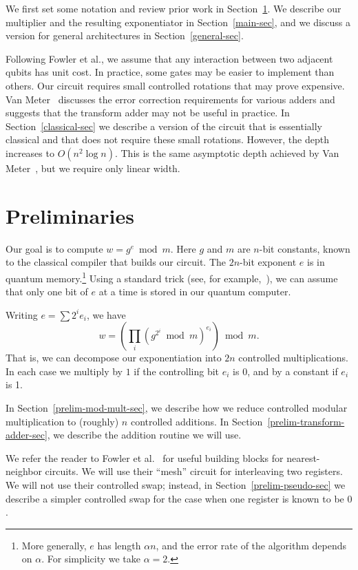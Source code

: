 \documentclass{article} %
\begin{document}
We first set some notation and review prior work in Section~\ref{prelim-sec}.
We describe our multiplier and the resulting exponentiator
in Section~\ref{main-sec}, and we discuss a version for general
architectures in Section~\ref{general-sec}.

Following Fowler et al., we assume that any interaction between two
adjacent qubits has unit cost.  In practice, some gates may be easier
to implement than others.  Our circuit requires small controlled rotations
that may prove expensive.  Van Meter~\cite{V} discusses the error correction
requirements for various adders and suggests that the transform adder may not
be useful in practice.
In Section~\ref{classical-sec}
we describe a version of the circuit that is essentially classical
and that does not require these small rotations.  However, the
depth increases to $O(n^2 \log n)$.  This is the same asymptotic
depth achieved by Van Meter~\cite{V}, but we require only linear width.

\section{Preliminaries}
\label{prelim-sec}

Our goal is to compute $w = g^e \bmod m$.  Here $g$ and $m$
are $n$-bit constants, known to the classical compiler that builds
our circuit.  The $2n$-bit exponent $e$ is in quantum
memory.\footnote{More generally, $e$ has length $\alpha n$, and the
error rate of the algorithm depends on $\alpha$.  For simplicity
we take $\alpha = 2$.}  Using
a standard trick (see, for example,~\cite{Beau}),
we can assume that only one bit of
$e$ at a time is stored in our quantum computer.

Writing $e = \sum 2^i e_i$, we have 
$$
w = \left(\prod_i (g^{2^i} \bmod m)^{e_i}\right) \bmod m.
$$
That is, we can decompose our exponentiation into $2n$ controlled
multiplications.  In each case we multiply by $1$ if the controlling
bit $e_i$ is $0$, and by a constant if $e_i$ is 1.

In Section~\ref{prelim-mod-mult-sec}, we describe how we reduce
controlled modular multiplication to (roughly) $n$ controlled
additions.  In Section~\ref{prelim-transform-adder-sec}, we describe
the addition routine we will use.

We refer the reader to Fowler et al.~\cite{FDH} for
useful building blocks for nearest-neighbor circuits.  We will use
their ``mesh'' circuit for interleaving two registers.  We will
not use their controlled swap; instead, in Section~\ref{prelim-pseudo-sec}
we describe a simpler controlled swap for the case when one register is
known to be $0$.
\end{document}
